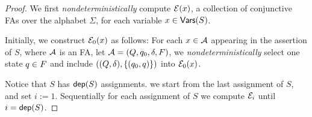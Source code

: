 \begin{proof}

We first \emph{nondeterministically} compute $\mathcal{E}(x)$, a collection of conjunctive FAs over the alphabet $\Sigma$, for each variable $x \in \mathsf{Vars}(S)$. %

Initially, %
we construct $\mathcal{E}_0(x)$ as follows: For each %
$x \in \mathcal{A}$ appearing in the assertion of $S$, where $\mathcal{A}$ is an FA, let $\mathcal{A} = (Q, q_0, \delta, F)$, we \emph{nondeterministically} select one state $q \in F$ and include $((Q, \delta), \{(q_0, q)\})$ into $\mathcal{E}_0(x)$.
  


Notice that $S$ has $\mathsf{dep}(S)$ assignments. we start from the last assignment of $S$, and set $i:=1$. Sequentially for each assignment of $S$ we compute  $\mathcal{E}_{i}$ until $i=\mathsf{dep}(S)$.  
%


\end{proof}
